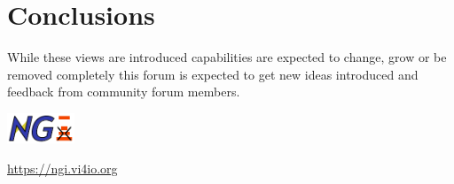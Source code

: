 \documentclass[a4paper, twocolumn]{article}
\begin{document}
\section{Conclusions}
While these views are introduced capabilities are expected to change, grow or be removed completely this forum is expected to get new ideas introduced and feedback from community forum members.


\includegraphics[width=2cm]{ngi-logo}

\noindent\url{https://ngi.vi4io.org}
\end{document}
